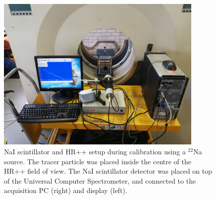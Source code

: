 \documentclass[]{article}
\begin{document}
\begin{figure}[h!]
	\includegraphics[width=10cm]{NAIsetup.jpg}
	\centering
	\captionsetup{justification=centering,margin=2cm}
	\caption{NaI scintillator and HR++ setup during calibration using a ${}^{22}$Na source. The tracer particle was placed inside the centre of the HR++ field of view. The NaI scintillator detector was placed on top of the Universal Computer Spectrometer, and connected to the acquisition PC (right) and display (left).}
	\label{fig:NaIandHRSetupPIC}
\end{figure}
~\\
\end{document}
